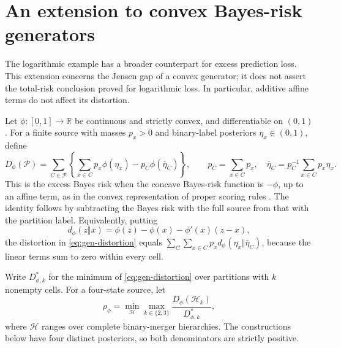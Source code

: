 \section{An extension to convex Bayes-risk generators}
\label{sec:general-losses}

The logarithmic example has a broader counterpart for excess prediction
loss. This extension concerns the Jensen gap of a convex generator; it
does not assert the total-risk conclusion proved for logarithmic loss.
In particular, additive affine terms do not affect its distortion.

Let $\phi:[0,1]\to\mathbb R$ be continuous and strictly convex, and
differentiable on $(0,1)$. For a finite source with masses $p_x>0$ and
binary-label posteriors $\eta_x\in(0,1)$, define
\begin{equation}
 D_\phi(\mathcal P)
 =\sum_{C\in\mathcal P}\left\{
       \sum_{x\in C}p_x\phi(\eta_x)
       -p_C\phi(\bar\eta_C)\right\},
 \qquad
 p_C=\sum_{x\in C}p_x,\quad
 \bar\eta_C=p_C^{-1}\sum_{x\in C}p_x\eta_x.
 \label{eq:gen-distortion}
\end{equation}
This is the excess Bayes risk when the concave Bayes-risk function is
$-\phi$, up to an affine term, as in the convex representation of proper
scoring rules \cite[Theorem 1]{gneiting2007}. The identity follows by subtracting the
Bayes risk with the full source from that with the partition label.
Equivalently, putting
\begin{equation}
 d_\phi(z\Vert x)
 =\phi(z)-\phi(x)-\phi'(x)(z-x),
 \label{eq:gen-bregman}
\end{equation}
the distortion in \eqref{eq:gen-distortion} equals
$\sum_C\sum_{x\in C}p_xd_\phi(\eta_x\Vert\bar\eta_C)$, because the
linear terms sum to zero within every cell.

Write $D_{\phi,k}^*$ for the minimum of
\eqref{eq:gen-distortion} over partitions with $k$ nonempty cells.
For a four-state source, let
\begin{equation}
 \rho_\phi
 =\min_{\mathcal H}
   \max_{k\in\{2,3\}}
       \frac{D_\phi(\mathcal H_k)}{D_{\phi,k}^*},
 \label{eq:gen-price}
\end{equation}
where $\mathcal H$ ranges over complete binary-merger hierarchies.
The constructions below have four distinct posteriors, so both
denominators are strictly positive.

